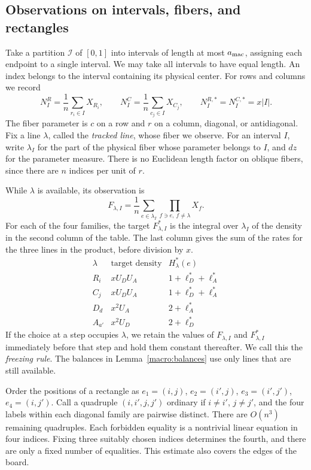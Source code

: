 \subsection{Observations on intervals, fibers, and rectangles}\label{macro:observaciones}

Take a partition $\mathcal I$ of $[0,1]$ into intervals of length at most $a_{\rm mac}$, assigning
each endpoint to a single interval. We may take all intervals to have equal length. An index belongs
to the interval containing its physical center. For rows and columns we record
\[
 N^R_I=\frac1n\sum_{r_i\in I}X_{R_i},\qquad
 N^C_I=\frac1n\sum_{c_j\in I}X_{C_j},\qquad
 N^{R,*}_I=N^{C,*}_I=x|I|.
\]
The fiber parameter is $c$ on a row and $r$ on a column, diagonal, or antidiagonal. Fix a line
$\lambda$, called the \emph{tracked line}, whose fiber we observe. For an interval $I$, write
$\lambda_I$ for the part of the physical fiber whose parameter belongs to $I$, and $dz$ for the
parameter measure. There is no Euclidean length factor on oblique fibers, since there are $n$
indices per unit of $r$.

\begin{definicion}\label{macro:fibras}
While $\lambda$ is available, its observation is
\[
 F_{\lambda,I}=\frac1n\sum_{e\in\lambda_I}
                  \prod_{f\ni e,\ f\ne\lambda}X_f .
\]
For each of the four families, the target $F^*_{\lambda,I}$ is the integral over $\lambda_I$ of the
density in the second column of the table. The last column gives the sum of the rates for the three
lines in the product, before division by $x$.
\[
\begin{array}{c|c|c}
 \lambda & \text{target density} & H^*_{\lambda}(e)\\ \hline
 R_i & xU_DU_A  & 1+\ell_D^*+\ell_A^*\\
 C_j & xU_DU_A  & 1+\ell_D^*+\ell_A^*\\
 D_d & x^2U_A   & 2+\ell_A^*\\
 A_{a'} & x^2U_D & 2+\ell_D^*
\end{array}
\]
If the choice at a step occupies $\lambda$, we retain the values of $F_{\lambda,I}$ and
$F^*_{\lambda,I}$ immediately before that step and hold them constant thereafter. We call this the
\emph{freezing rule}. The balances in Lemma~\ref{macro:balances} use only lines that are still
available.
\end{definicion}

Order the positions of a rectangle as
$e_1=(i,j)$, $e_2=(i',j)$, $e_3=(i',j')$, $e_4=(i,j')$.
Call a quadruple $(i,i',j,j')$ ordinary if $i\ne i'$, $j\ne j'$, and the four labels within each
diagonal family are pairwise distinct. There are $O(n^3)$ remaining quadruples. Each forbidden
equality is a nontrivial linear equation in four indices. Fixing three suitably chosen indices
determines the fourth, and there are only a fixed number of equalities. This estimate also covers
the edges of the board.

